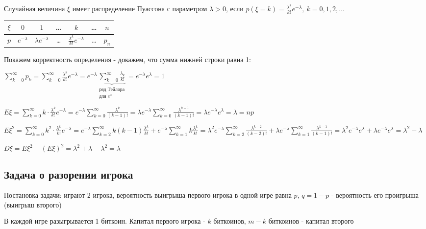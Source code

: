\documentclass[12pt]{article}
\begin{document}
    \Def Случайная величина $\xi$ имеет распределение Пуассона с параметром $\lambda > 0$, если $p(\xi = k) = \frac{\lambda^k}{k!}e^{-\lambda}, \ k = 0, 1, 2, \dots$

    \smallvspace

    \begin{tabular}{c|c|c|c|c|c|c}
        $\xi$ & $0$ & $1$ & \dots & $k$ & \dots & $n$    \\
        \hline
        $p$   & $e^{-\lambda}$ & $\lambda e^{-\lambda}$ & \dots & $\frac{\lambda^k}{k!}e^{-\lambda}$ & \dots & $p_n$
    \end{tabular}

    \smallvspace

    Покажем корректность определения - докажем, что сумма нижней строки равна 1:

    $\sum_{k = 0}^\infty p_k = \sum_{k = 0}^\infty \frac{\lambda^k}{k!} e^{-\lambda} = e^{-\lambda} \underset{\substack{\text{ряд Тейлора}\\ \text{для } e^x}}{\underbrace{\sum_{k = 0}^\infty \frac{\lambda_k}{k!}}} = e^{-\lambda} e^\lambda = 1$

    $E\xi = \sum_{k = 0}^\infty k \cdot \frac{\lambda^k}{k!}e^{-\lambda} = e^{-\lambda} \sum_{k = 0}^\infty \frac{\lambda^k}{(k - 1)!} = 
    \lambda e^{-\lambda} \sum_{k = 0}^\infty \frac{\lambda^{k - 1}}{(k - 1)!} = \lambda e^{-\lambda} e^\lambda = \lambda = np$

    
    $E\xi^2 = \sum_{k = 0}^\infty k^2 \cdot \frac{\lambda^k}{k!}e^{-\lambda} = e^{-\lambda} \sum_{k = 2}^\infty k(k - 1) \frac{\lambda^k}{k!} + 
    e^{-\lambda} \sum_{k = 1}^\infty k \frac{\lambda^k}{k!} = \lambda^2 e^{-\lambda} \sum_{k = 2}^\infty \frac{\lambda^{k - 2}}{(k - 2)!} + 
    \lambda e^{-\lambda} \sum_{k = 1}^\infty \frac{\lambda^{k - 1}}{(k - 1)!} = \lambda^2 e^{-\lambda} e^\lambda + \lambda e^{-\lambda} e^\lambda = \lambda^2 + \lambda$

    $D\xi = E\xi^2 - (E\xi)^2 = \lambda^2 + \lambda - \lambda^2 = \lambda$

    \clearpage

    \subsection{Задача о разорении игрока}

    Постановка задачи: играют 2 игрока, вероятность выигрыша первого игрока в одной игре равна $p$, $q = 1 - p$ - вероятность его проигрыша (выигрыш второго)

    В каждой игре разыгрывается 1 биткоин. Капитал первого игрока - $k$ биткоинов, $m - k$ биткоинов - капитал второго
\end{document}
